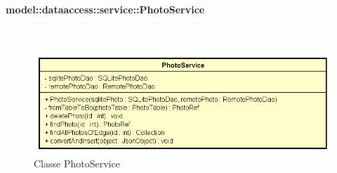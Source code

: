 \documentclass[../DefinizioneDiProdotto.tex]{subfiles}
\begin{document}
\paragraph{model::dataaccess::service::PhotoService}
\
\begin{figure}[H]
	\centering
	\includegraphics[width=\maxwidth]{img/PhotoService.png}
	\caption{Classe PhotoService}\label{fig:model::dataaccess::service::PhotoService} 
\end{figure}
\end{document}
